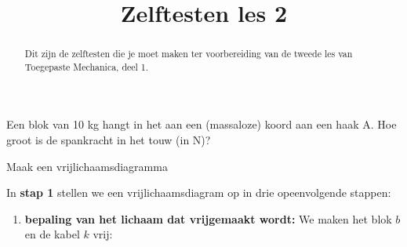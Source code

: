 \documentclass{ximera}
\title{Zelftesten les 2}
\begin{document}
\begin{abstract}
Dit zijn de zelftesten die je moet maken ter voorbereiding van de tweede les van Toegepaste Mechanica, deel 1.
\end{abstract}
\maketitle

\begin{question}
Een blok van 10 kg hangt in het aan een (massaloze) koord aan een haak A. 
Hoe groot is de spankracht in het touw (in N)?


\newcommand{\length}{2cm}
\newcommand{\angleDef}{30}
\newcommand{\width}{\length * 0.866}
\newcommand{\height}{\length *0.5}
\newcommand{\lengthBelow}{1cm}
\newcommand{\sideCube}{1cm}
\newcommand{\radius}{\length / 3}

%   
%   
%   
%  
%   
%   

\begin{hint}
 Maak een vrijlichaamsdiagramma
\begin{hint} 
 In \textbf{stap 1} stellen we een vrijlichaamsdiagram op in drie opeenvolgende stappen:
\begin{enumerate}
 \item \textbf{bepaling van het lichaam dat vrijgemaakt wordt:} \newline
 We maken het blok $b$ en de kabel $k$ vrij:
 
%    
% 
 

\end{enumerate}
\end{hint}
\end{hint}
\end{question}
\end{document}
